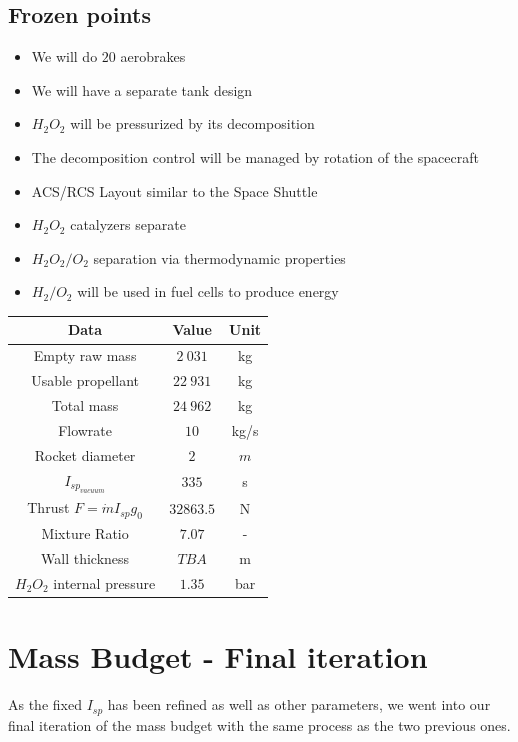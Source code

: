 \subsection{Frozen points}
\begin{itemize}
	\item We will do $20$ aerobrakes
	\item We will have a separate tank design
	\item $H_2O_2$ will be pressurized by its decomposition
	\item The decomposition control will be managed by rotation of the spacecraft
	\item ACS/RCS Layout similar to the Space Shuttle
	\item $H_2O_2$ catalyzers separate
	\item $H_2O_2/O_2$ separation via thermodynamic properties
	\item $H_2/O_2$ will be used in fuel cells to produce energy
\end{itemize}
\begin{center}
	\begin{tabular}[H]{|c|c|c|}
		\hline
		\cellcolor{gray!50}Data & \cellcolor{gray!50}Value & \cellcolor{gray!50}Unit\\
		\hline
		Empty raw mass & $2\ 031$ & kg\\
		\hline
		Usable propellant & $22\ 931$ &kg\\
		\hline
		\cellcolor{green!50}Total mass & \cellcolor{green!50}$24\ 962$ & \cellcolor{green!50}kg\\
		\hline
		Flowrate & $10$ & kg/s\\
		\hline
		Rocket diameter & $2$ & $m$\\
		\hline
		$I_{sp_{vacuum}}$ & $335$ & s\\
		\hline
		Thrust $F=\dot m I_{sp} g_0$ & $32 863.5$ &N\\
		\hline
		Mixture Ratio & $7.07$ & -\\
		\hline
		Wall thickness & $TBA$ & m\\
		\hline
		$H_2O_2$ internal pressure & $1.35$ & bar\\
		\hline
	\end{tabular}
\end{center}
\newpage
\section{Mass Budget - Final iteration}
As the fixed $I_{sp}$ has been refined as well as other parameters, we went into our final iteration of the mass budget with the same process as the two previous ones.
